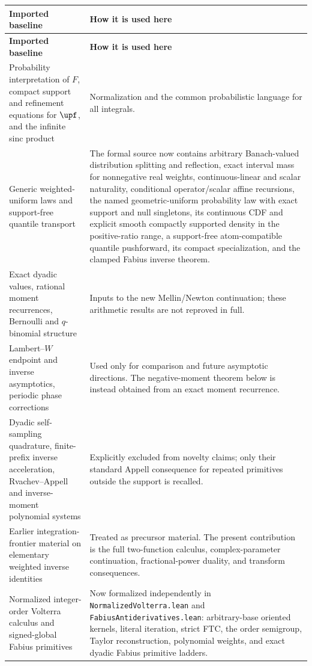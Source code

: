 \documentclass[11pt,oneside]{article}
\theoremstyle{definition}
\theoremstyle{remark}
\newcommand{\F}{F}
\newcommand{\1}{\mathbf 1}
\begin{document}
\begin{longtable}{@{}p{}p{}@{}}
\toprule
\textbf{Imported baseline} & \textbf{How it is used here}\\
\midrule
\endfirsthead
\toprule
\textbf{Imported baseline} & \textbf{How it is used here}\\
\midrule
\endhead
Probability interpretation of \(\F\), compact support and refinement equations for
\(\upf\), and the infinite sinc product & Normalization and the common probabilistic
language for all integrals.\\
Generic weighted-uniform laws and support-free quantile transport & The formal source now
contains arbitrary Banach-valued distribution splitting and reflection, exact interval
mass for nonnegative real weights, continuous-linear and scalar naturality, conditional
operator/scalar affine recursions, the named geometric-uniform probability law with exact
support and null singletons, its continuous CDF and explicit smooth compactly supported
density in the positive-ratio range, a support-free atom-compatible quantile pushforward,
its compact specialization, and the clamped Fabius inverse theorem.\\
Exact dyadic values, rational moment recurrences, Bernoulli and \(q\)-binomial structure &
Inputs to the new Mellin/Newton continuation; these arithmetic results are not reproved
in full.\\
Lambert--\(W\) endpoint and inverse asymptotics, periodic phase corrections & Used only
for comparison and future asymptotic directions.  The negative-moment theorem below is
instead obtained from an exact moment recurrence.\\
Dyadic self-sampling quadrature, finite-prefix inverse acceleration, Rvachev--Appell and
inverse-moment polynomial systems & Explicitly excluded from novelty claims; only their
standard Appell consequence for repeated primitives outside the support is recalled.\\
Earlier integration-frontier material on elementary weighted inverse identities & Treated
as precursor material.  The present contribution is the full two-function calculus,
complex-parameter continuation, fractional-power duality, and transform consequences.\\
Normalized integer-order Volterra calculus and signed-global Fabius primitives &
Now formalized independently in \texttt{NormalizedVolterra.lean} and
\texttt{FabiusAntiderivatives.lean}: arbitrary-base oriented kernels, literal iteration,
strict FTC, the order semigroup, Taylor reconstruction, polynomial weights, and exact
dyadic Fabius primitive ladders.\\
\bottomrule
\end{longtable}
\end{document}
